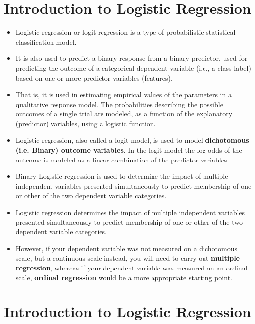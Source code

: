 ﻿\documentclass[a4paper,12pt]{article}
\begin{document}
\section{Introduction to Logistic Regression}
\begin{itemize}
	\item Logistic regression or logit regression is a type of probabilistic statistical classification model.
	
	\item It is also used to predict a binary response from a binary predictor, used for predicting the outcome of a categorical dependent variable (i.e., a class label) based on one or more predictor variables (features). 
	
	\item That is, it is used in estimating empirical values of the parameters in a qualitative response model. The probabilities describing the possible outcomes of a single trial are modeled, as a function of the explanatory (predictor) variables, using a logistic function. 
	
	\item Logistic regression, also called a logit model, is used to model \textbf{dichotomous (i.e. Binary) outcome variables}. In the logit model the log odds of the outcome is modeled as a linear combination of the predictor variables.
	
	\item 
	Binary Logistic regression is used to determine the impact of multiple independent variables
	presented simultaneously to predict membership of one or other of the two
	dependent variable categories.
	\item Logistic regression determines the impact of multiple independent variables
	presented simultaneously to predict membership of one or other of the two
	dependent variable categories.
	\item However, if your dependent variable was not measured on a dichotomous scale, but a continuous scale instead, you will need to carry out \textbf{multiple regression}, whereas if your dependent variable was measured on an ordinal scale, \textbf{ordinal regression} would be a more appropriate starting point.
\end{itemize}



\section*{Introduction to Logistic Regression}
\end{document}
